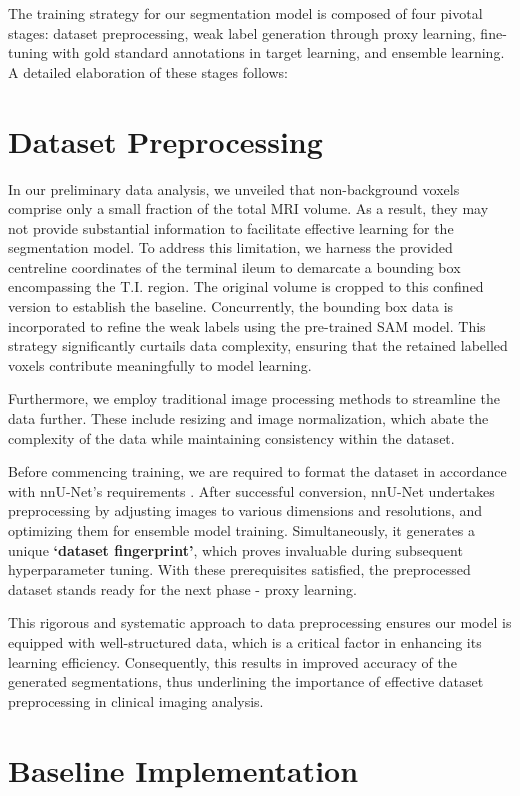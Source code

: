The training strategy for our segmentation model is composed of four pivotal stages: dataset preprocessing, weak label generation through proxy learning, fine-tuning with gold standard annotations in target learning, and ensemble learning. A detailed elaboration of these stages follows:

\section{Dataset Preprocessing}

In our preliminary data analysis, we unveiled that non-background voxels comprise only a small fraction of the total MRI volume. As a result, they may not provide substantial information to facilitate effective learning for the segmentation model. To address this limitation, we harness the provided centreline coordinates of the terminal ileum to demarcate a bounding box encompassing the T.I. region. The original volume is cropped to this confined version to establish the baseline. Concurrently, the bounding box data is incorporated to refine the weak labels using the pre-trained SAM model. This strategy significantly curtails data complexity, ensuring that the retained labelled voxels contribute meaningfully to model learning.

Furthermore, we employ traditional image processing methods to streamline the data further. These include resizing and image normalization, which abate the complexity of the data while maintaining consistency within the dataset.

Before commencing training, we are required to format the dataset in accordance with nnU-Net's requirements \cite{isensee2021nnu}. After successful conversion, nnU-Net undertakes preprocessing by adjusting images to various dimensions and resolutions, and optimizing them for ensemble model training. Simultaneously, it generates a unique \textbf{`dataset fingerprint'}, which proves invaluable during subsequent hyperparameter tuning. With these prerequisites satisfied, the preprocessed dataset stands ready for the next phase - proxy learning.

This rigorous and systematic approach to data preprocessing ensures our model is equipped with well-structured data, which is a critical factor in enhancing its learning efficiency. Consequently, this results in improved accuracy of the generated segmentations, thus underlining the importance of effective dataset preprocessing in clinical imaging analysis.

\section{Baseline Implementation}

